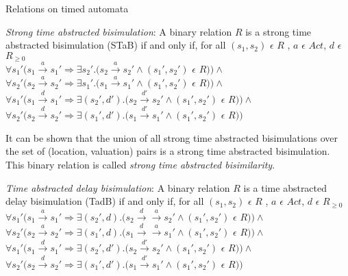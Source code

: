 \documentclass{beamer}
\begin{document}
\begin{frame}[allowframebreaks]{Relations on timed automata}
\begin{definition} 
\label{def:stab} 
  \emph{Strong time abstracted bisimulation}: A binary relation
  $R$ is a strong time abstracted bisimulation (STaB) if and only if, for all
  $(s_1, s_2)$ $\epsilon$ $R$ , $a$ $\epsilon$ $Act $, $d$ $\epsilon$ $R_{\ge 0}$\\
  $\forall s_1' (s_1 \xrightarrow{a} s_1' \Rightarrow \exists s_2'
  . (s_2 \xrightarrow{a} s_2' \wedge (s_1', s_2')$ $\epsilon$ $R ) )
  \wedge $ \\
  $\forall s_2' (s_2 \xrightarrow{a} s_2' \Rightarrow \exists s_1'
  . (s_1 \xrightarrow{a} s_1' \wedge (s_1', s_2')$ $\epsilon$ $R ) ) \wedge $ \\
  $\forall s_1' (s_1 \xrightarrow{d} s_1' \Rightarrow \exists (s_2',
  d')
  . (s_2 \xrightarrow{d'} s_2' \wedge (s_1', s_2')$ $\epsilon$ $R ) )
  \wedge $ \\
  $\forall s_2' (s_2 \xrightarrow{d} s_2' \Rightarrow \exists (s_1', d')
  . (s_1 \xrightarrow{d'} s_1' \wedge (s_1', s_2')$ $\epsilon$ $R ) ) $ \\
\end{definition}

It can be shown that the union of all strong time abstracted
  bisimulations over the set of (location, valuation) pairs is a
  strong time abstracted bisimulation. This binary relation is called
  \textit{strong time abstracted bisimilarity}.

\begin{definition}
  \emph{Time abstracted delay bisimulation}: A binary relation
  $R$ is a time abstracted delay bisimulation (TadB) if and only if, for all
  $(s_1, s_2)$ $\epsilon$ $R$ , $a$ $\epsilon$ $Act $, $d$ $\epsilon$ $R_{\ge 0}$\\
  $\forall s_1' (s_1 \xrightarrow{a} s_1' \Rightarrow \exists (s_2', d)
  . (s_2 \xrightarrow{d} \xrightarrow{a} s_2' \wedge (s_1', s_2')$ $\epsilon$ $R ) )
  \wedge $ \\
  $\forall s_2' (s_2 \xrightarrow{a} s_2' \Rightarrow \exists (s_1', d)
  . (s_1 \xrightarrow{d} \xrightarrow{a} s_1' \wedge (s_1', s_2')$
  $\epsilon$ $R ) ) 
  \wedge $ \\
  $\forall s_1' (s_1 \xrightarrow{d} s_1' \Rightarrow \exists (s_2',
  d')
  . (s_2 \xrightarrow{d'} s_2' \wedge (s_1', s_2')$ $\epsilon$ $R ) )
  \wedge $ \\
  $\forall s_2' (s_2 \xrightarrow{d} s_2' \Rightarrow \exists (s_1', d')
  . (s_1 \xrightarrow{d'} s_1' \wedge (s_1', s_2')$ $\epsilon$ $R ) ) $ \\
\end{definition}


\end{frame}
\end{document}
